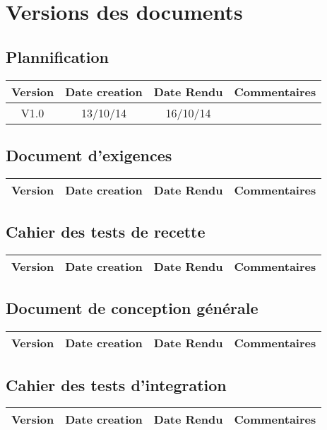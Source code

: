 \documentclass[fleqn, a4paper]{report}
\begin{document}
  \chapter*{Versions des documents}
  
  \section*{Plannification}
    \begin{tabular}{|c|c|c|c|}
      \hline
      Version & Date creation & Date Rendu & Commentaires\\
      \hline
      V1.0 & 13/10/14 & 16/10/14 & \\
      \hline
    \end{tabular}
    
   \section*{Document d'exigences}
    \begin{tabular}{|c|c|c|c|}
      \hline
      Version & Date creation & Date Rendu & Commentaires\\
      \hline
    \end{tabular}
    
   \section*{Cahier des tests de recette}
    \begin{tabular}{|c|c|c|c|}
      \hline
      Version & Date creation & Date Rendu & Commentaires\\
      \hline
    \end{tabular}  
    
   \section*{Document de conception générale}
    \begin{tabular}{|c|c|c|c|}
      \hline
      Version & Date creation & Date Rendu & Commentaires\\
      \hline
    \end{tabular}  
    
   \section*{Cahier des tests d'integration}
    \begin{tabular}{|c|c|c|c|}
      \hline
      Version & Date creation & Date Rendu & Commentaires\\
      \hline
    \end{tabular}  
    
\end{document}
